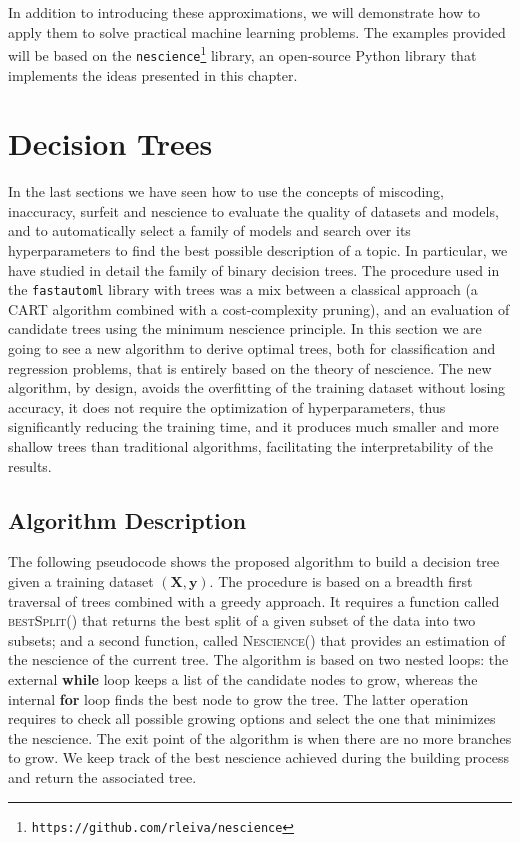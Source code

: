 In addition to introducing these approximations, we will demonstrate how to apply them to solve practical machine learning problems. The examples provided will be based on the \texttt{nescience}\footnote{\texttt{https://github.com/rleiva/nescience}} library, an open-source Python library that implements the ideas presented in this chapter.


%
%

\section{Decision Trees}
\label{sec:decision_trees}

In the last sections we have seen how to use the concepts of miscoding, inaccuracy, surfeit and nescience to evaluate the quality of datasets and models, and to automatically select a family of models and search over its hyperparameters to find the best possible description of a topic. In particular, we have studied in detail the family of binary decision trees. The procedure used in the \texttt{fastautoml} library with trees was a mix between a classical approach (a CART algorithm combined with a cost-complexity pruning), and an evaluation of candidate trees using the minimum nescience principle. In this section we are going to see a new algorithm to derive optimal trees, both for classification and regression problems, that is entirely based on the theory of nescience. The new algorithm, by design, avoids the overfitting of the training dataset without losing accuracy, it does not require the optimization of hyperparameters, thus significantly reducing the training time, and it produces much smaller and more shallow trees than traditional algorithms, facilitating the interpretability of the results.

\subsection{Algorithm Description}
\label{sub:tree_algorithm_description}

The following pseudocode shows the proposed algorithm to build a decision tree given a training dataset $(\mathbf{X}, \mathbf{y})$. The procedure is based on a breadth first traversal of trees combined with a greedy approach. It requires a function called \textsc{bestSplit()} that returns the best split of a given subset of the data into two subsets; and a second function, called \textsc{Nescience()} that provides an estimation of the nescience of the current tree. The algorithm is based on two nested loops: the external \textbf{while} loop keeps a list of the candidate nodes to grow, whereas the internal \textbf{for} loop finds the best node to grow the tree. The latter operation requires to check all possible growing options and select the one that minimizes the nescience. The exit point of the algorithm is when there are no more branches to grow. We keep track of the best nescience achieved during the building process and return the associated tree.


